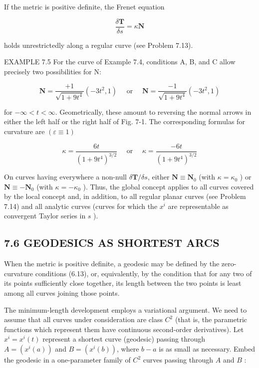 \documentclass[10pt]{article}
\begin{document}
If the metric is positive definite, the Frenet equation


\begin{equation*}
\frac{\delta \mathbf{T}}{\delta s}=\kappa \mathbf{N} \tag{7.9}
\end{equation*}


holds unrestrictedly along a regular curve (see Problem 7.13).

EXAMPLE 7.5 For the curve of Example 7.4, conditions A, B, and C allow precisely two possibilities for N:

$$
\mathbf{N}=\frac{+1}{\sqrt{1+9 t^{4}}}\left(-3 t^{2}, 1\right) \quad \text { or } \quad \mathbf{N}=\frac{-1}{\sqrt{1+9 t^{4}}}\left(-3 t^{2}, 1\right)
$$

for $-\infty<t<\infty$. Geometrically, these amount to reversing the normal arrows in either the left half or the right half of Fig. 7-1. The corresponding formulas for curvature are $(\varepsilon \equiv 1)$

$$
\kappa=\frac{6 t}{\left(1+9 t^{4}\right)^{3 / 2}} \quad \text { or } \quad \kappa=\frac{-6 t}{\left(1+9 t^{4}\right)^{3 / 2}}
$$

On curves having everywhere a non-null $\delta \mathbf{T} / \delta s$, either $\mathbf{N} \equiv \mathbf{N}_{0}$ (with $\kappa=\kappa_{0}$ ) or $\mathbf{N} \equiv-\mathbf{N}_{0}$ (with $\kappa=-\kappa_{0}$ ). Thus, the global concept applies to all curves covered by the local concept and, in addition, to all regular planar curves (see Problem 7.14) and all analytic curves (curves for which the $x^{i}$ are representable as convergent Taylor series in $s$ ).

\subsection*{7.6 GEODESICS AS SHORTEST ARCS}
When the metric is positive definite, a geodesic may be defined by the zero-curvature conditions (6.13), or, equivalently, by the condition that for any two of its points sufficiently close together, its length between the two points is least among all curves joining those points.

The minimum-length development employs a variational argument. We need to assume that all curves under consideration are class $C^{2}$ (that is, the parametric functions which represent them have continuous second-order derivatives). Let $x^{i}=x^{i}(t)$ represent a shortest curve (geodesic) passing through $A=\left(x^{i}(a)\right)$ and $B=\left(x^{i}(b)\right)$, where $b-a$ is as small as necessary. Embed the geodesic in a one-parameter family of $C^{2}$ curves passing through $A$ and $B$ :
\end{document}
